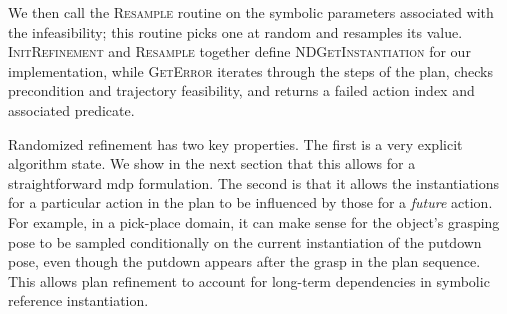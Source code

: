 We then call the \textsc{Resample} routine on the symbolic parameters
associated with the infeasibility; this routine picks one at random and
resamples its value. \textsc{InitRefinement} and \textsc{Resample} together define
\textsc{NDGetInstantiation} for our implementation, while \textsc{GetError} iterates
through the steps of the plan, checks precondition and trajectory feasibility, and returns
a failed action index and associated predicate.

Randomized refinement has two key properties. The first is a very
explicit algorithm state.  We show in the next section that this
allows for a straightforward {\sc mdp} formulation. The second is that
it allows the instantiations for a particular action in the plan to be
influenced by those for a \emph{future} action. For example, in a
pick-place domain, it can make sense for the object's grasping pose to
be sampled conditionally on the current instantiation of the putdown
pose, even though the putdown appears after the grasp in the plan
sequence. This allows plan refinement to account for long-term
dependencies in symbolic reference instantiation.
